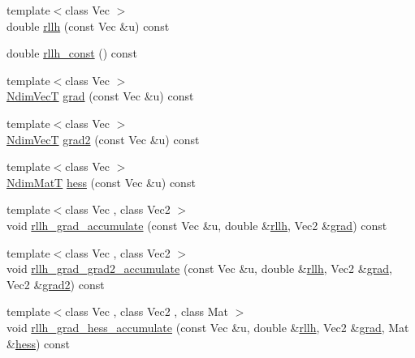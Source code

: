 \begin{DoxyCompactItemize}
\item 
{\footnotesize template$<$class Vec $>$ }\\double \hyperlink{classprior__hessian_1_1AMHCopula_a4c1752aeba875e7ab9563a1a7cd1524b}{rllh} (const Vec \&u) const 
\item 
double \hyperlink{classprior__hessian_1_1AMHCopula_ab0031223c39aec7287cc3cfa3160f6e8}{rllh\+\_\+const} () const 
\item 
{\footnotesize template$<$class Vec $>$ }\\\hyperlink{classprior__hessian_1_1AMHCopula_aee8626a3e27e52d8bfecc5201808660a}{Ndim\+VecT} \hyperlink{classprior__hessian_1_1AMHCopula_a7c3f0e7eb7f4c8eecd37563c35e1f819}{grad} (const Vec \&u) const 
\item 
{\footnotesize template$<$class Vec $>$ }\\\hyperlink{classprior__hessian_1_1AMHCopula_aee8626a3e27e52d8bfecc5201808660a}{Ndim\+VecT} \hyperlink{classprior__hessian_1_1AMHCopula_af87cadcd28d6af3fa8249932f7d01ec7}{grad2} (const Vec \&u) const 
\item 
{\footnotesize template$<$class Vec $>$ }\\\hyperlink{classprior__hessian_1_1AMHCopula_a258252a11a49d2c73e19696b2e0e683d}{Ndim\+MatT} \hyperlink{classprior__hessian_1_1AMHCopula_a324c075c80fb95ed8b69bd601e6a4de6}{hess} (const Vec \&u) const 
\item 
{\footnotesize template$<$class Vec , class Vec2 $>$ }\\void \hyperlink{classprior__hessian_1_1AMHCopula_ad86ca50954d51be0a25a9523f4d7ff5a}{rllh\+\_\+grad\+\_\+accumulate} (const Vec \&u, double \&\hyperlink{classprior__hessian_1_1AMHCopula_a4c1752aeba875e7ab9563a1a7cd1524b}{rllh}, Vec2 \&\hyperlink{classprior__hessian_1_1AMHCopula_a7c3f0e7eb7f4c8eecd37563c35e1f819}{grad}) const 
\item 
{\footnotesize template$<$class Vec , class Vec2 $>$ }\\void \hyperlink{classprior__hessian_1_1AMHCopula_ae6aab20b3c845dfe2dd699df724755eb}{rllh\+\_\+grad\+\_\+grad2\+\_\+accumulate} (const Vec \&u, double \&\hyperlink{classprior__hessian_1_1AMHCopula_a4c1752aeba875e7ab9563a1a7cd1524b}{rllh}, Vec2 \&\hyperlink{classprior__hessian_1_1AMHCopula_a7c3f0e7eb7f4c8eecd37563c35e1f819}{grad}, Vec2 \&\hyperlink{classprior__hessian_1_1AMHCopula_af87cadcd28d6af3fa8249932f7d01ec7}{grad2}) const 
\item 
{\footnotesize template$<$class Vec , class Vec2 , class Mat $>$ }\\void \hyperlink{classprior__hessian_1_1AMHCopula_ab869b33caebfb6ae4e94f180c8f851bb}{rllh\+\_\+grad\+\_\+hess\+\_\+accumulate} (const Vec \&u, double \&\hyperlink{classprior__hessian_1_1AMHCopula_a4c1752aeba875e7ab9563a1a7cd1524b}{rllh}, Vec2 \&\hyperlink{classprior__hessian_1_1AMHCopula_a7c3f0e7eb7f4c8eecd37563c35e1f819}{grad}, Mat \&\hyperlink{classprior__hessian_1_1AMHCopula_a324c075c80fb95ed8b69bd601e6a4de6}{hess}) const 

\end{DoxyCompactItemize}
